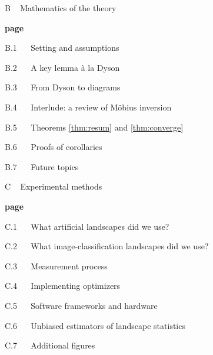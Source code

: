 \documentclass[anon,12pt]{colt2021} %
\begin{document}
        {\bf
        \par\noindent B ~ Mathematics of the theory}                            \hfill {\bf page \pageref{appendix:math}}
        \par\indent     B.1 ~~ Setting and assumptions                          \hfill \pageref{appendix:assumptions}
        \par\indent     B.2 ~~ A key lemma \`a la Dyson                         \hfill \pageref{appendix:key-lemma}
        \par\indent     B.3 ~~ From Dyson to diagrams                           \hfill \pageref{appendix:toward-diagrams}
        \par\indent     B.4 ~~ Interlude: a review of M\"obius inversion        \hfill \pageref{appendix:mobius}
        \par\indent     B.5 ~~ Theorems \ref{thm:resum} and \ref{thm:converge}  \hfill \pageref{appendix:resum}
        \par\indent     B.6 ~~ Proofs of corollaries                            \hfill \pageref{appendix:corollaries}
        \par\indent     B.7 ~~ Future topics                                    \hfill \pageref{appendix:future}
    
        {\bf
        \par\noindent C ~ Experimental methods}                                 \hfill {\bf page \pageref{appendix:experiments}}
        \par\indent     C.1 ~~ What artificial landscapes did we use?           \hfill \pageref{appendix:artificial}  
        \par\indent     C.2 ~~ What image-classification landscapes did we use? \hfill \pageref{appendix:natural}
        \par\indent     C.3 ~~ Measurement process                              \hfill \pageref{appendix:measure}
        \par\indent     C.4 ~~ Implementing optimizers                          \hfill \pageref{appendix:optimizers}
        \par\indent     C.5 ~~ Software frameworks and hardware                 \hfill \pageref{appendix:frameworks}
        \par\indent     C.6 ~~ Unbiased estimators of landscape statistics      \hfill \pageref{appendix:bessel}
        \par\indent     C.7 ~~ Additional figures                               \hfill \pageref{appendix:figures}
 
\end{document}
